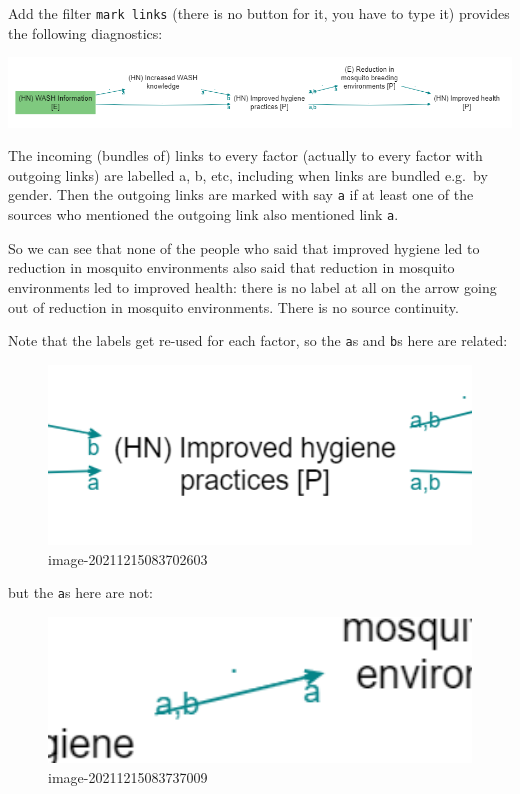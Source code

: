 \documentclass[
]{book}
\begin{document}
Add the filter \texttt{mark\ links} (there is no button for it, you have to type it) provides the following diagnostics:

\includegraphics{_assets/image-20211215081328481.png}

The incoming (bundles of) links to every factor (actually to every factor with outgoing links) are labelled a, b, etc, including when links are bundled e.g.~by gender. Then the outgoing links are marked with say \texttt{a} if at least one of the sources who mentioned the outgoing link also mentioned link \texttt{a}.

So we can see that none of the people who said that improved hygiene led to reduction in mosquito environments also said that reduction in mosquito environments led to improved health: there is no label at all on the arrow going out of reduction in mosquito environments. There is no source continuity.

Note that the labels get re-used for each factor, so the \texttt{a}s and \texttt{b}s here are related:

\begin{figure}
\centering
\includegraphics[width=6.77083in,height=\textheight]{_assets/image-20211215083702603.png}
\caption{image-20211215083702603}
\end{figure}

but the \texttt{a}s here are not:

\begin{figure}
\centering
\includegraphics[width=6.77083in,height=\textheight]{_assets/image-20211215083737009.png}
\caption{image-20211215083737009}
\end{figure}
\end{document}
